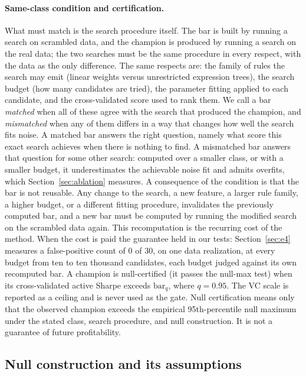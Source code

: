 \documentclass[11pt]{article}
\begin{document}
\paragraph{Same-class condition and certification.} What must match is the search procedure itself.
The bar is built by running a search on scrambled data, and the champion is produced by running a
search on the real data; the two searches must be the same procedure in every respect, with the data as
the only difference. The same respects are: the family of rules the search may emit (linear weights
versus unrestricted expression trees), the search budget (how many candidates are tried), the parameter
fitting applied to each candidate, and the cross-validated score used to rank them. We call a bar
\emph{matched} when all of these agree with the search that produced the champion, and \emph{mismatched}
when any of them differs in a way that changes how well the search fits noise. A matched bar answers the
right question, namely what score this exact search achieves when there is nothing to find. A mismatched
bar answers that question for some other search: computed over a smaller class, or with a smaller
budget, it underestimates the achievable noise fit and admits overfits, which
Section~\ref{sec:ablation} measures. A consequence of the condition is that the bar is not reusable.
Any change to the search, a new feature, a larger rule family, a higher budget, or a different fitting
procedure, invalidates the previously computed bar, and a new bar must be computed by running the
modified search on the scrambled data again. This recomputation is the recurring cost of the method.
When the cost is paid the guarantee held in our tests: Section~\ref{sec:e4} measures a false-positive
count of 0 of 30, on one data realization, at every budget from ten to ten thousand candidates, each budget judged against its own
recomputed bar. A champion is null-certified (it passes the null-max test) when its cross-validated
active Sharpe exceeds $\mathrm{bar}_q$, where $q=0.95$. The VC scale is reported as a ceiling and is never used as the
gate. Null certification means only that the observed champion exceeds the empirical 95th-percentile
null maximum under the stated class, search procedure, and null construction. It is not a guarantee of
future profitability.

\subsection{Null construction and its assumptions}
\label{sec:nullassume}
\end{document}
